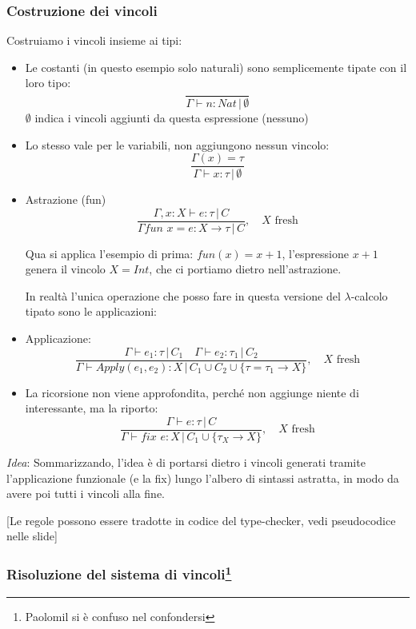 \documentclass[a4paper,10pt]{article}
\begin{document}
 \subsubsection{Costruzione dei vincoli}
 Costruiamo i vincoli insieme ai tipi:
 \begin{itemize}
  \item Le costanti (in questo esempio solo naturali) sono semplicemente tipate con il loro tipo:
  \[\dfrac{}{\Gamma \vdash n : Nat \,|\, \emptyset}\]
  $\emptyset$ indica i vincoli aggiunti da questa espressione (nessuno)
  \item Lo stesso vale per le variabili, non aggiungono nessun vincolo:
  \[ \dfrac{\Gamma(x) = \tau}{\Gamma \vdash x : \tau \,|\, \emptyset} \]
  \item Astrazione (fun)
  \[ \dfrac{\Gamma, x : X \vdash e : \tau \,|\, C}{\Gamma fun \,\,x = e:X \to \tau \,|\, C} ,\quad X\text{ fresh}\]
  
  Qua si applica l'esempio di prima: $fun(x) = x + 1 $, l'espressione $x+1$ genera il vincolo $X = Int$, che ci portiamo dietro nell'astrazione. 
  
  In realtà l'unica operazione che posso fare in questa versione del $\lambda$-calcolo tipato sono le applicazioni:
  \item Applicazione:
  \[ \dfrac{\Gamma \vdash e_1 : \tau \,|\, C_1 \quad \Gamma \vdash e_2 : \tau_1 \,|\, C_2}{\Gamma \vdash Apply(e_1, e_2):X \,|\, C_1 \cup C_2 \cup \{ \tau = \tau_1 \to X \}},\quad X\text{ fresh} \]
  \item La ricorsione non viene approfondita, perché non aggiunge niente di interessante, ma la riporto:
  \[ \dfrac{\Gamma \vdash e : \tau \,|\, C}{\Gamma \vdash fix \,\, e:X \,|\, C_1 \cup \{ \tau_X \to X \}},\quad X\text{ fresh} \]
 \end{itemize}
\emph{Idea}: Sommarizzando, l'idea è di portarsi dietro i vincoli generati tramite l'applicazione funzionale (e la fix) lungo l'albero di sintassi astratta, in modo da avere poi tutti i vincoli alla fine.\smallskip

[Le regole possono essere tradotte in codice del type-checker, vedi pseudocodice nelle slide]


\subsubsection{Risoluzione del sistema di vincoli\protect\footnote{Paolomil si è confuso nel confondersi}}
\end{document}
